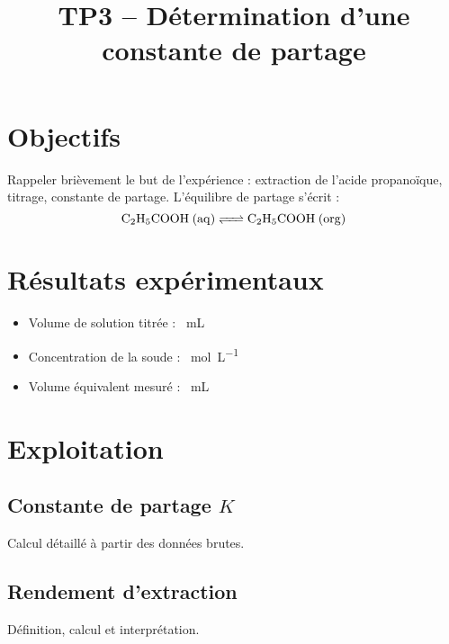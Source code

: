 \documentclass[12pt,a4paper]{article}
\title{TP3 – Détermination d'une constante de partage}
\author{}
\date{}
\begin{document}
	\maketitle
	
\section{Objectifs}

Rappeler brièvement le but de l'expérience : extraction de l'acide propanoïque, titrage, constante de partage. L’équilibre de partage s’écrit :
\[ \ce{C2H5COOH (aq) <=> C2H5COOH (org)} \]


	
\section{Résultats expérimentaux}
	\begin{itemize}
		\item Volume de solution titrée : \SI{}{\milli\liter}
		\item Concentration de la soude : \SI{}{\mole\per\liter}
		\item Volume équivalent mesuré : \SI{}{\milli\liter}
	\end{itemize}
	
	\section{Exploitation}
	\subsection{Constante de partage $K$}
	Calcul détaillé à partir des données brutes.
	
	\subsection{Rendement d’extraction}
	Définition, calcul et interprétation.
	
\end{document}
